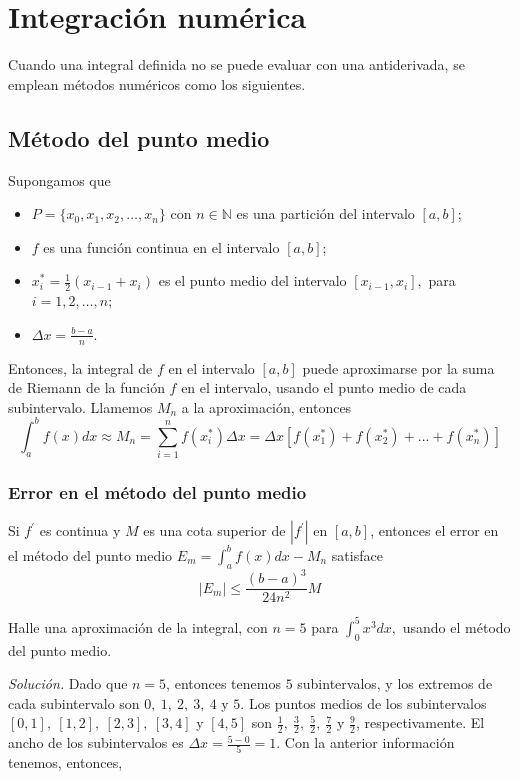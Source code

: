 \section{Integración numérica}

Cuando una integral definida no se puede evaluar con una antiderivada, se emplean métodos numéricos como los siguientes.

\subsection*{Método del punto medio}

Supongamos que
\begin{itemize}
\item $P=\{x_0,x_1,x_2,\ldots,x_n \}$ con $n\in\mathbb{N}$ es una partición del intervalo $[a,b]$;
\item $f$ es una función continua en el intervalo $[a,b]$;
\item $x_{i}^{*}=\frac{1}{2}\left( x_{i-1}+x_{i}\right)$ es el punto medio del intervalo $[x_{i-1},x_{i}],$ para $i=1,2,\ldots,n$;
\item $\Delta x=\frac{b-a}{n}$.
\end{itemize}

 
Entonces, la integral de $f$ en el intervalo $[a,b]$ puede aproximarse por la suma de Riemann de la función $f $ en el intervalo, usando el punto medio de cada subintervalo. Llamemos $M_{n}$ a la aproximación, entonces
\[
\int_{a}^{b}f(x)dx\approx M_{n}=\sum\limits_{i=1}^{n}f(x_{i}^{*})\Delta x=\Delta x[f(x_{1}^{* })+f(x_{2}^{*
})+\ldots +f(x_{n}^{* })]
\]

\subsubsection*{Error en el método del punto medio}

Si $f^{\prime}$ es continua y $M$ es una cota superior de $\left\vert
f^{\prime}\right\vert $ en $\left[ a,b\right] $, entonces el error en el método del punto medio {\small $E_{m}=\displaystyle\int_{a}^{b}f(x)dx-M_{n}$} satisface
\[
\left\vert E_{m}\right\vert \leq \frac{\left( b-a\right) ^{3}}{24n^{2}}M
\]

\begin{ejemplo}
\textnormal{Halle una aproximación de la integral, con $n=5$ para \textit{$\int_{0}^{5}x^{3}dx,$} usando el método del punto medio.}
\end{ejemplo}

\textit{Solución.} Dado que $n=5$, entonces tenemos $5$ subintervalos, y los extremos de cada subintervalo son {\small $0,\ 1,\ 2,\ 3,\ 4$ y $5$.} Los puntos medios de los subintervalos $[0,1],\ [1,2],\ [2,3],\ [3,4]$ y $[4,5]$ son $\frac{1}{2},\ \frac{3}{2},\ \frac{5}{2},\ \frac{7}{2}$ y $\frac{9}{2}$, respectivamente. El ancho de los subintervalos es $\Delta x=\frac{5-0}{5}=1$. Con la anterior información tenemos, entonces,


